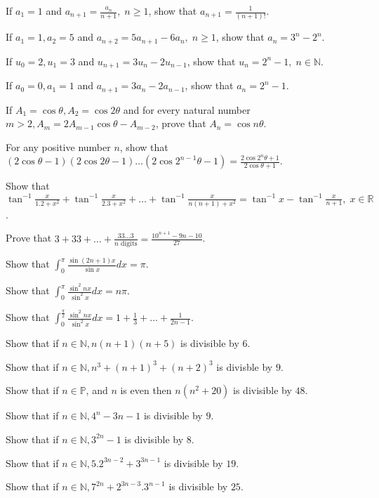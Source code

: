 \item If $a_1 = 1$ and $a_{n + 1} = \frac{a_n}{n + 1},\;n\geq 1$, show that $a_{n + 1} = \frac{1}{(n + 1)!}$.
\item If $a_1 = 1, a_2 = 5$ and $a_{n + 2} = 5a_{n + 1} - 6a_n,\;n\geq 1$, show that $a_n = 3^n - 2^n$.
\item If $u_0 = 2, u_1 = 3$ and $u_{n + 1} = 3u_n - 2u_{n - 1}$, show that $u_n = 2^n - 1,\;n\in \mathbb{N}$.
\item If $a_0 = 0, a_1 = 1$ and $a_{n + 1} = 3a_n - 2a_{n - 1}$, show that $a_n = 2^n - 1$.
\item If $A_1 = \cos\theta, A_2 = \cos2\theta$ and for every natural number $m > 2, A_m = 2A_{m-1}\cos\theta - A_{m - 2}$, prove
  that $A_n = \cos n\theta$.
\item For any positive number $n$, show that $(2\cos\theta - 1)(2\cos2\theta - 1)\ldots(2\cos2^{n - 1}\theta - 1) =
  \frac{2\cos2^n\theta + 1}{2\cos\theta + 1}$.
\item Show that $\tan^{-1}\frac{x}{1.2 + x^2} + \tan^{-1}\frac{x}{2.3 + x^2} + \ldots + \tan^{-1}\frac{x}{n(n + 1) + x^2} =
  \tan^{-1}x - \tan^{-1}\frac{x}{n + 1},\;x\in \mathbb{R}$.
\item Prove that $3 + 33 + \ldots + \frac{33\ldots3}{n\text{~digits}} = \frac{10^{n + 1} - 9n - 10}{27}$.
\item Show that $\displaystyle\int_{0}^\pi\frac{\sin(2n + 1)x}{\sin x}dx = \pi$.
\item Show that $\displaystyle\int_{0}^\pi\frac{\sin^2nx}{\sin^2x}dx = n\pi$.
\item Show that $\displaystyle\int_{0}^{\frac{\pi}{2}}\frac{\sin^2nx}{\sin^2x}dx = 1 + \frac{1}{3} + \ldots + \frac{1}{2n - 1}$.
\item Show that if $n\in\mathbb{N}, n(n + 1)(n + 5)$ is divisible by $6$.
\item Show that if $n\in\mathbb{N}, n^3 + (n + 1)^3 + (n + 2)^3$ is divisble by $9$.
\item Show that if $n\in\mathbb{P}$, and $n$ is even then $n(n^2 + 20)$ is divisible by $48$.
\item Show that if $n\in\mathbb{N}, 4^n - 3n - 1$ is divisible by $9$.
\item Show that if $n\in\mathbb{N}, 3^{2n} - 1$ is divisible by $8$.
\item Show that if $n\in\mathbb{N}, 5.2^{3n - 2} + 3^{3n - 1}$ is divisible by $19$.
\item Show that if $n\in\mathbb{N}, 7^{2n} + 2^{3n - 3}.3^{n - 1}$ is divisible by $25$.
